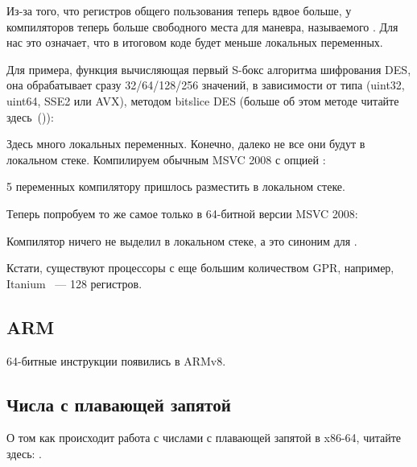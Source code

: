 Из-за того, что регистров общего пользования теперь вдвое больше, у компиляторов теперь больше 
свободного места для маневра, называемого .
Для нас это означает, что в итоговом коде будет меньше локальных переменных.

Для примера, функция вычисляющая первый S-бокс алгоритма шифрования DES, 
она обрабатывает сразу 32/64/128/256 значений, в зависимости от типа  (uint32, uint64, SSE2 или AVX), 
методом bitslice DES (больше об этом методе читайте здесь~()):



Здесь много локальных переменных. Конечно, далеко не все они будут в локальном стеке. 
Компилируем обычным MSVC 2008 с опцией :



5 переменных компилятору пришлось разместить в локальном стеке.

Теперь попробуем то же самое только в 64-битной версии MSVC 2008:



Компилятор ничего не выделил в локальном стеке, а  это синоним для .

\iffalse
Кстати, видно, что функция сохраняет регистры \RCX, \RDX в отведенных для 
этого вызываемой функцией местах, 
а \Reg{8} и \Reg{9} не сохраняет, а начинает использовать их сразу.

\fi

Кстати, существуют процессоры с еще большим количеством \ac{GPR}, например, 
Itanium ~--- 128 регистров.

\subsection{ARM}

64-битные инструкции появились в ARMv8.

\subsection{Числа с плавающей запятой}

О том как происходит работа с числами с плавающей запятой в x86-64, читайте здесь: .

